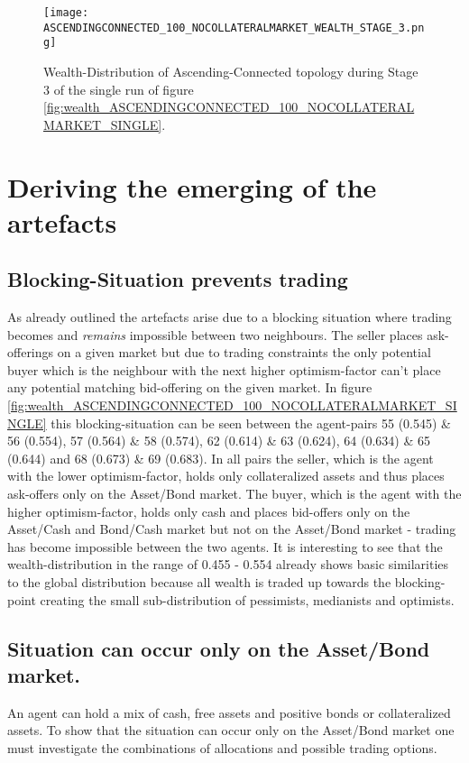 \documentclass[Bachelorarbeit.tex]{subfiles}
\begin{document}
\begin{figure}[H]
	\centering
  \texttt{[image: ASCENDINGCONNECTED\_100\_NOCOLLATERALMARKET\_WEALTH\_STAGE\_3.png]}
  	\caption{Wealth-Distribution of Ascending-Connected topology during Stage 3 of the single run of figure \ref{fig:wealth_ASCENDINGCONNECTED_100_NOCOLLATERALMARKET_SINGLE}.}
	\label{fig:markets_ASCENDINGCONNECTED_100_NOCOLLATERALMARKET_WEALTH_STAGE_3}
\end{figure}

\section{Deriving the emerging of the artefacts}
\label{sec:ARTEFACTS_DRIVING}

\subsection{Blocking-Situation prevents trading} As already outlined the artefacts arise due to a blocking situation where trading becomes and \textit{remains} impossible between two neighbours. The seller places ask-offerings on a given market but due to trading constraints the only potential buyer which is the neighbour with the next higher optimism-factor can't place any potential matching bid-offering on the given market. In figure \ref{fig:wealth_ASCENDINGCONNECTED_100_NOCOLLATERALMARKET_SINGLE} this blocking-situation can be seen between the agent-pairs 55 (0.545) \& 56 (0.554), 57 (0.564) \& 58 (0.574), 62 (0.614) \& 63 (0.624), 64 (0.634) \& 65 (0.644) and 68 (0.673) \& 69 (0.683). In all pairs the seller, which is the agent with the lower optimism-factor, holds only collateralized assets and thus places ask-offers only on the Asset/Bond market. The buyer, which is the agent with the higher optimism-factor, holds only cash and places bid-offers only on the Asset/Cash and Bond/Cash market but not on the Asset/Bond market - trading has become impossible between the two agents. It is interesting to see that the wealth-distribution in the range of 0.455 - 0.554 already shows basic similarities to the global distribution because all wealth is traded up towards the blocking-point creating the small sub-distribution of pessimists, medianists and optimists.

\subsection{Situation can occur only on the Asset/Bond market.} An agent can hold a mix of cash, free assets and positive bonds or collateralized assets. To show that the situation can occur only on the Asset/Bond market one must investigate the combinations of allocations and possible trading options.
\end{document}
